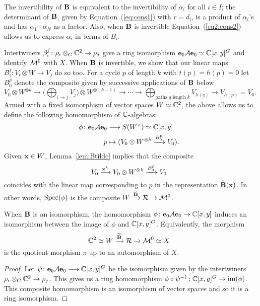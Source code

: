 \documentclass{amsart}
\theoremstyle{definition}
\begin{document}
\begin{remark}
The invertibility of $\mathbf{B}$ is equivalent to the invertibility of $\alpha_i$ for all $i \in I$; the determinant of $\mathbf{B}$, given by Equation~(\ref{eq:cons1}) with $r=d_i$, is a product of $\alpha_i$'s and has $\alpha_1 \cdots \alpha_N$ as a factor.
Also, when $\mathbf{B}$ is invertible Equation~(\ref{eq2:cons2}) allows us to express $\alpha_i$ in terms of $B_i$.
\end{remark}

Intertwiners $\beta_i^j \colon \rho_i \otimes_G \mathbb{C}^2 \rightarrow \rho_j$ give a ring isomorphism $\mathbf{e}_0 \mathcal{A} \mathbf{e}_0 \simeq \mathbb{C}[x,y]^G$ and identify $\mathcal{M}^0$ with $X$.
When $\mathbf{B}$ is invertible, we show that our linear maps $B_i^j \colon V_i \otimes W \rightarrow V_j$ do so too.
For a cycle $p$ of length $k$ with $t(p)=h(p)=0$ let $B_0^p$ denote the composite given by successive applications of $\mathbf{B}$ below $$V_0 \otimes W^{\otimes k} \longrightarrow \Bigg(\bigoplus_{i \rightarrow j} V_j\Bigg) \otimes W^{\otimes (k-1)} \rightarrow \cdots \rightarrow \bigoplus_{\text{paths } q \text{ length } k} V_{h(q)} \rightarrow V_{h(p)}=V_0.$$
Armed with a fixed isomorphism of vector spaces $W \simeq \mathbb{C}^2$, the above allows us to define the following homomorphism of $\mathbb{C}$-algebras:
\begin{align*}
\phi \colon \mathbf{e}_0 \mathcal{A} \mathbf{e}_0 &\longrightarrow S(W^\vee) \simeq \mathbb{C}[x,y]
\\ p &\mapsto (V_0 \otimes W^{\otimes k} \xrightarrow{B_0^p} V_0).
\end{align*}
Given $\mathbf{x} \in W$, Lemma~\ref{lem:Btilde} implies that the composite $$V_0 \xrightarrow{\mathbf{x}^k} V_0 \otimes W^{\otimes k} \xrightarrow{B_0^p} V_0$$ coincides with the linear map corresponding to $p$ in the representation $\widetilde{\mathbf{B}}(\mathbf{x})$.
In other words, $\operatorname{Spec}(\phi)$ is the composite $W \xrightarrow{\widetilde{\mathbf{B}}} \mathcal{R} \rightarrow \mathcal{M}^0$.

\begin{lemma}\label{lem:e0Ae0}
When $\mathbf{B}$ is an isomorphism, the homomorphism $\phi \colon \mathbf{e}_0 \mathcal{A} \mathbf{e}_0 \rightarrow \mathbb{C}[x,y]$
induces an isomorphism between the image of $\phi$ and $\mathbb{C}[x,y]^G$.
Equivalently, the morphism $$\mathbb{C}^2 \simeq W \xrightarrow{\widetilde{\mathbf{B}}} \mathcal{R} \rightarrow \mathcal{M}^0 \simeq X$$ is the quotient morphism $\pi$ up to an automorphism of $X$.
\end{lemma}

\begin{proof}
Let $\psi \colon \mathbf{e}_0 \mathcal{A} \mathbf{e}_0 \longrightarrow \mathbb{C}[x,y]^G$ be the isomorphism given by the intertwiners $\rho_i \otimes_G \mathbb{C}^2 \rightarrow \rho_j$.
This gives us a ring homomorphism $\phi \circ \psi^{-1} \colon \mathbb{C}[x,y]^G \rightarrow \text{im}(\phi)$.
This composite homomorphism is an isomorphism of vector spaces and so it is a ring isomorphism.
\end{proof}
\end{document}
